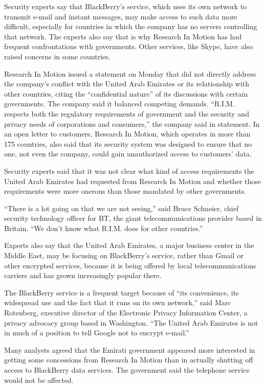 ﻿\documentclass[12pt]{article}
\begin{document}
Security experts say that BlackBerry's service, which uses its own network to transmit e-mail and
instant messages, may make access to such data more difficult, especially for countries in which the
company has no servers controlling that network. The experts also say that is why Research In Motion
has had frequent confrontations with governments. Other services, like Skype, have also raised
concerns in some countries.

Research In Motion issued a statement on Monday that did not directly address the company's conflict
with the United Arab Emirates or its relationship with other countries, citing the ``confidential
nature'' of its discussions with certain governments. The company said it balanced competing
demands. ``R.I.M. respects both the regulatory requirements of government and the security and
privacy needs of corporations and consumers,'' the company said in statement. In an open letter to
customers, Research In Motion, which operates in more than 175 countries, also said that its
security system was designed to ensure that no one, not even the company, could gain unauthorized
access to customers' data.

Security experts said that it was not clear what kind of access requirements the United Arab
Emirates had requested from Research In Motion and whether those requirements were more onerous than
those mandated by other governments.

``There is a lot going on that we are not seeing,'' said Bruce Schneier, chief security technology
officer for BT, the giant telecommunications provider based in Britain. ``We don't know what R.I.M.
does for other countries.''

Experts also say that the United Arab Emirates, a major business center in the Middle East, may be
focusing on BlackBerry's service, rather than Gmail or other encrypted services, because it is being
offered by local telecommunications carriers and has grown increasingly popular there.

The BlackBerry service is a frequent target because of ``its convenience, its widespread use and the
fact that it runs on its own network,'' said Marc Rotenberg, executive director of the Electronic
Privacy Information Center, a privacy advocacy group based in Washington. ``The United Arab Emirates
is not in much of a position to tell Google not to encrypt e-mail.''

Many analysts agreed that the Emirati government appeared more interested in getting some
concessions from Research In Motion than in actually shutting off access to BlackBerry data
services. The government said the telephone service would not be affected.
\end{document}
